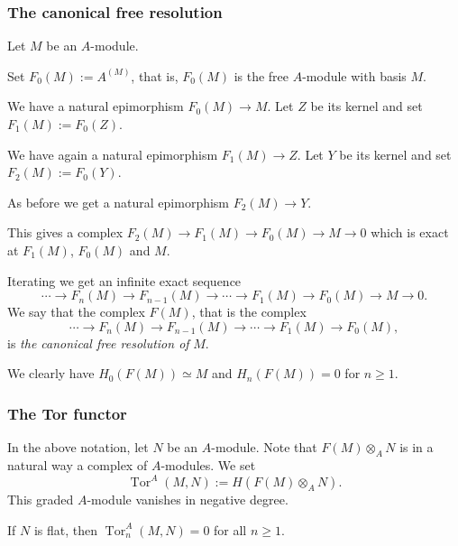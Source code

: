 \documentclass[parskip=half,fontsize=12pt]{scrartcl}%
\newcommand{\Tor}{\operatorname{Tor}}
\begin{document}

\subsubsection{The canonical free resolution}

Let $M$ be an $A$-module. 

Set $F_0(M):=A^{(M)}$, that is, $F_0(M)$ is the free $A$-module with basis $M$. 

We have a natural epimorphism $F_0(M)\to M$. Let $Z$ be its kernel and set $F_1(M):=F_0(Z)$. 

We have again a natural epimorphism $F_1(M)\to Z$. Let $Y$ be its kernel and set $F_2(M):=F_0(Y)$. 

As before we get a natural epimorphism $F_2(M)\to Y$. 

This gives a complex $F_2(M)\to F_1(M)\to F_0(M)\to M\to0$ which is exact at $F_1(M)$, $F_0(M)$ and $M$. 

Iterating we get an infinite exact sequence  
$$
\cdots\to F_n(M)\to F_{n-1}(M)\to\cdots\to F_1(M)\to F_0(M)\to M\to0.
$$ 
We say that the complex $F(M)$, that is the complex 
$$
\cdots\to F_n(M)\to F_{n-1}(M)\to\cdots\to F_1(M)\to F_0(M),
$$ 
is \emph{the canonical free resolution of} $M$. 

We clearly have $H_0(F(M))\simeq M$ and $H_n(F(M))=0$ for $n\ge1$.

\subsubsection{The Tor functor}\label{Tor-f}

In the above notation, let $N$ be an $A$-module. Note that $F(M)\otimes_AN$ is in a natural way a complex of $A$-modules. We set 
$$
\Tor^A(M,N):=H(F(M)\otimes_AN).
$$ 
This graded $A$-module vanishes in negative degree. 

If $N$ is flat, then $\Tor^A_n(M,N)=0$ for all $n\ge1$.
\end{document}
